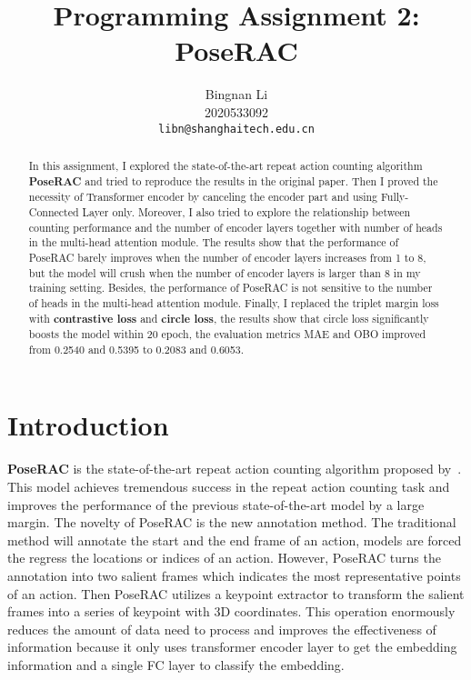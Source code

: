 \documentclass[10pt,twocolumn,letterpaper]{article}
\begin{document}
    \title{Programming Assignment 2: PoseRAC}

    \author{Bingnan Li\\
    2020533092\\
    {\tt\small libn@shanghaitech.edu.cn}
    }
    \maketitle

    \begin{abstract}
        In this assignment, I explored the state-of-the-art repeat action counting algorithm {\bf PoseRAC} and tried to
        reproduce the results in the original paper.
        Then I proved the necessity of Transformer encoder by canceling the encoder part and using Fully-Connected Layer only.
        Moreover, I also tried to explore the relationship between counting performance and the number of encoder layers
        together with number of heads in the multi-head attention module.
        The results show that the performance of PoseRAC barely improves when the number of encoder layers increases from 1 to 8,
        but the model will crush when the number of encoder layers is larger than 8 in my training setting.
        Besides, the performance of PoseRAC is not sensitive to the number of heads in the multi-head attention module.
        Finally, I replaced the triplet margin loss with {\bf contrastive loss} and {\bf circle loss}, the results show that
        circle loss significantly boosts the model within 20 epoch, the evaluation metrics MAE and OBO improved from 0.2540 and 0.5395 to 0.2083 and 0.6053.
    \end{abstract}



    \section{Introduction}
    \label{sec:intro}

    {\bf PoseRAC} is the state-of-the-art repeat action counting algorithm proposed by~\cite{yao2023poserac}.
    This model achieves tremendous success in the repeat action counting task and improves the performance of the previous
    state-of-the-art model by a large margin.
    The novelty of PoseRAC is the new annotation method.
    The traditional method will annotate the start and the end frame of an action, models are forced the regress the locations or indices
    of an action.
    However, PoseRAC turns the annotation into two salient frames which indicates the most representative points of an action.
    Then PoseRAC utilizes a keypoint extractor to transform the salient frames into a series of keypoint with 3D coordinates.
    This operation enormously reduces the amount of data need to process and improves the effectiveness of information because
    it only uses transformer encoder layer to get the embedding information and a single FC layer to classify the embedding.
\end{document}
